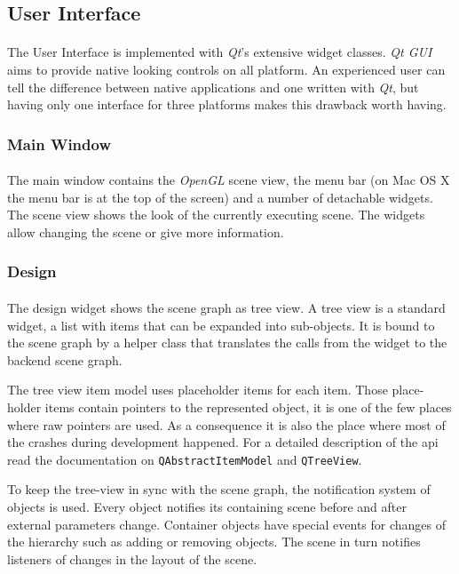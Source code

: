 \subsection{User Interface\label{ImplementationUI}}
\paragraph{}
The User Interface is implemented with \textit{Qt}'s extensive widget classes.
\textit{Qt GUI} aims to provide native looking controls on all platform.
An experienced user can tell the difference between native applications and one written with \textit{Qt}, but having only one interface for three platforms makes this drawback worth having.


\subsubsection{Main Window}
\paragraph{}
The main window contains the \textit{OpenGL} scene view, the menu bar (on Mac OS X the menu bar is at the top of the screen) and a number of detachable widgets.
The scene view shows the look of the currently executing scene.
The widgets allow changing the scene or give more information.

\subsubsection{Design}
\paragraph{}
The design widget shows the scene graph as tree view.
A tree view is a standard widget, a list with items that can be expanded into sub-objects.
It is bound to the scene graph by a helper class that translates the calls from the widget to the backend scene graph.

The tree view item model uses placeholder items for each item.
Those place-holder items contain pointers to the represented object, it is one of the few places where raw pointers are used.
As a consequence it is also the place where most of the crashes during development happened.
For a detailed description of the api read the documentation on \lstinline{QAbstractItemModel} and \lstinline{QTreeView}.

To keep the tree-view in sync with the scene graph, the notification system of objects is used.
Every object notifies its containing scene before and after external parameters change.
Container objects have special events for changes of the hierarchy such as adding or removing objects.
The scene in turn notifies listeners of changes in the layout of the scene.

